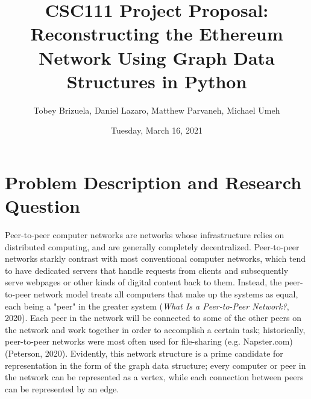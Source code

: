 \documentclass[fontsize=11pt]{article}
\title{CSC111 Project Proposal: Reconstructing the Ethereum Network Using Graph Data Structures in Python}
\author{Tobey Brizuela, Daniel Lazaro, Matthew Parvaneh, Michael Umeh}
\date{Tuesday, March 16, 2021}
\begin{document}
\maketitle

\section*{Problem Description and Research Question}


    Peer-to-peer computer networks are networks whose infrastructure relies on distributed computing, and are generally completely decentralized. Peer-to-peer networks starkly contrast with most conventional computer networks, which tend to have dedicated servers that handle requests from clients and subsequently serve webpages or other kinds of digital content back to them. Instead, the peer-to-peer network model treats all computers that make up the systems as equal, each being a "peer" in the greater system (\textit{What Is a Peer-to-Peer Network?}, 2020). Each peer in the network will be connected to some of the other peers on the network and work together in order to accomplish a certain task; historically, peer-to-peer networks were most often used for file-sharing (e.g. Napster.com) (Peterson, 2020). Evidently, this network structure is a prime candidate for representation in the form of the graph data structure; every computer or peer in the network can be represented as a vertex, while each connection between peers can be represented by an edge. \\
    
\end{document}
